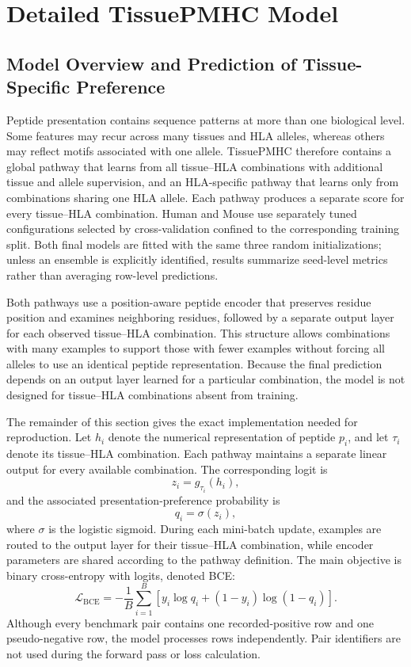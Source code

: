 \section{Detailed TissuePMHC Model}
\label{sec:detailed-model}

\subsection{Model Overview and Prediction of Tissue-Specific Preference}

Peptide presentation contains sequence patterns at more than one biological level. Some features may recur across many tissues and HLA alleles, whereas others may reflect motifs associated with one allele. TissuePMHC therefore contains a global pathway that learns from all tissue--HLA combinations with additional tissue and allele supervision, and an HLA-specific pathway that learns only from combinations sharing one HLA allele. Each pathway produces a separate score for every tissue--HLA combination. Human and Mouse use separately tuned configurations selected by cross-validation confined to the corresponding training split. Both final models are fitted with the same three random initializations; unless an ensemble is explicitly identified, results summarize seed-level metrics rather than averaging row-level predictions.

Both pathways use a position-aware peptide encoder that preserves residue position and examines neighboring residues, followed by a separate output layer for each observed tissue--HLA combination. This structure allows combinations with many examples to support those with fewer examples without forcing all alleles to use an identical peptide representation. Because the final prediction depends on an output layer learned for a particular combination, the model is not designed for tissue--HLA combinations absent from training.

The remainder of this section gives the exact implementation needed for reproduction. Let \(h_i\) denote the numerical representation of peptide \(p_i\), and let \(\tau_i\) denote its tissue--HLA combination. Each pathway maintains a separate linear output for every available combination. The corresponding logit is
\[
z_i=g_{\tau_i}(h_i),
\]
and the associated presentation-preference probability is
\[
q_i=\sigma(z_i),
\]
where \(\sigma\) is the logistic sigmoid. During each mini-batch update, examples are routed to the output layer for their tissue--HLA combination, while encoder parameters are shared according to the pathway definition. The main objective is binary cross-entropy with logits, denoted BCE:
\[
\mathcal{L}_{\mathrm{BCE}}
=
-\frac{1}{B}
\sum_{i=1}^{B}
\left[
y_i\log q_i+(1-y_i)\log(1-q_i)
\right].
\]
Although every benchmark pair contains one recorded-positive row and one pseudo-negative row, the model processes rows independently. Pair identifiers are not used during the forward pass or loss calculation.

